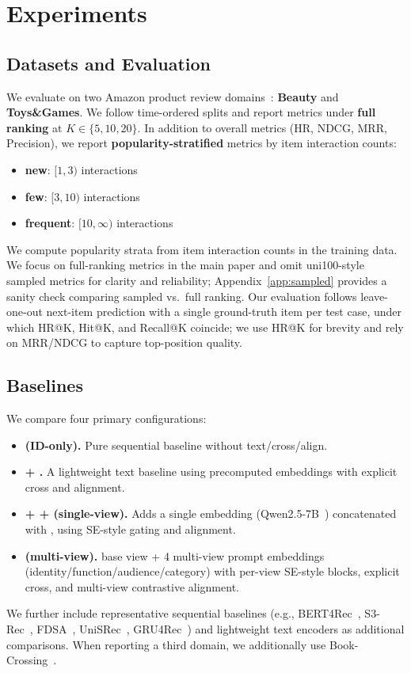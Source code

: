 \section{Experiments}
\subsection{Datasets and Evaluation}
We evaluate on two Amazon product review domains~\cite{mcauley2015amazon,ni2019amazon}: \textbf{Beauty} and
\textbf{Toys\&Games}. We follow time-ordered splits and
report metrics under \textbf{full ranking} at $K\in\{5,10,20\}$.
In addition to overall metrics (HR, NDCG, MRR, Precision),
we report \textbf{popularity-stratified} metrics by item
interaction counts:
\begin{itemize}[leftmargin=*,itemsep=1pt]
  \item \textbf{new}: $[1,3)$ interactions
  \item \textbf{few}: $[3,10)$ interactions
  \item \textbf{frequent}: $[10,\infty)$ interactions
\end{itemize}
We compute popularity strata from item interaction counts in
the training data. We focus on full-ranking metrics in the
main paper and omit uni100-style sampled metrics for clarity
and reliability; Appendix~\ref{app:sampled} provides a sanity
check comparing sampled vs.\ full ranking. Our evaluation
follows leave-one-out next-item prediction with a single
ground-truth item per test case, under which HR@K, Hit@K, and
Recall@K coincide; we use HR@K for brevity and rely on
MRR/NDCG to capture top-position quality.

\subsection{Baselines}
We compare four primary configurations:
\begin{itemize}[leftmargin=*,itemsep=2pt]
  \item \textbf{\base (ID-only).} Pure sequential baseline
    without text/cross/align.
  \item \textbf{\base + \tfidf.} A lightweight text baseline
    using precomputed \tfidf embeddings with explicit cross
    and alignment.
  \item \textbf{\base + \tfidf + \llm (single-view).} Adds a
    single \llm embedding (Qwen2.5-7B~\cite{qwen2024qwen25}) concatenated with
    \tfidf, using SE-style gating and alignment.
  \item \textbf{\model (multi-view).} \tfidf base view + 4
    multi-view \llm prompt embeddings
    (identity/function/audience/category) with per-view SE-style blocks,
    explicit cross, and multi-view contrastive alignment.
\end{itemize}
We further include representative sequential baselines (e.g.,
BERT4Rec~\cite{sun2019bert4rec}, S3-Rec~\cite{zhou2020s3rec},
FDSA~\cite{zhang2019fdsa}, UniSRec~\cite{hou2022unisrec},
GRU4Rec~\cite{hidasi2016gru4rec})
and lightweight text encoders as additional comparisons.
When reporting a third domain, we additionally use
Book-Crossing~\cite{ziegler2005bookcrossing}.

